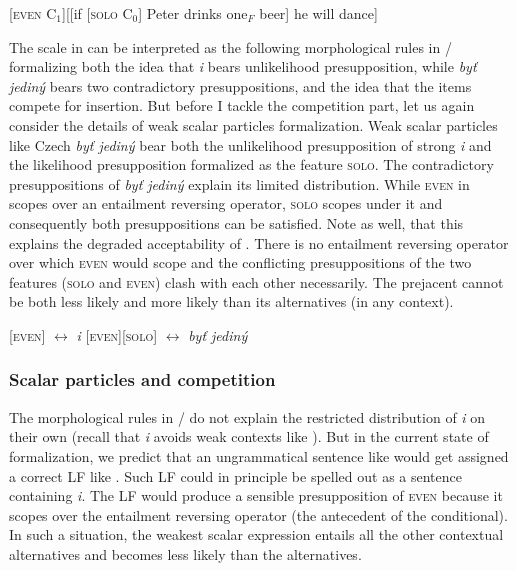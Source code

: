 \documentclass[output=paper,colorlinks,citecolor=brown]{langscibook}
\begin{document}
\ea\label{ex:46}[\textsc{even} C$_1$][[if [\textsc{solo} C$_0$] Peter drinks one$_F$ beer] he will dance]
\z

\noindent The scale in  can be interpreted as the following morphological rules in / formalizing both the idea that \emph{i} bears unlikelihood presupposition, while \emph{byť jediný} bears two contradictory presuppositions, and the idea that the items compete for insertion. But before I tackle the competition part, let us again consider the details of weak scalar particles formalization. Weak scalar particles like Czech \emph{byť jediný} bear both the unlikelihood presupposition of strong \emph{i} and the likelihood presupposition formalized as the feature \textsc{solo}.
The contradictory presuppositions of \emph{byť jediný} explain its limited distribution. While \textsc{even} in  scopes over an entailment reversing operator, \textsc{solo} scopes under it and consequently both presuppositions can be satisfied. Note as well, that this explains the degraded acceptability of . There is no entailment reversing operator over which \textsc{even} would scope and the conflicting presuppositions of the two features (\textsc{solo} and \textsc{even}) clash with each other necessarily. The prejacent cannot be both less likely and more likely than its alternatives (in any context).


\ea\label{ex:47} \ea\label{ex:48-a}[\textsc{even}] $\leftrightarrow$ \textit{i}
\ex\label{ex:48-b} [\textsc{even}][\textsc{solo}] $\leftrightarrow$ \textit{byť jediný}
\z
\z

\z

\subsubsection{Scalar particles and competition}\label{scalar-particles-and-competition}

The morphological rules in / do not explain the restricted distribution of \emph{i} on their own (recall that \emph{i} avoids weak contexts like ). But in the current state of formalization, we predict that an ungrammatical sentence like  would get assigned a correct LF like . Such LF could in principle be spelled out as a sentence containing \emph{i}. The LF  would produce a sensible presupposition of \textsc{even} because it scopes over the entailment reversing operator (the antecedent of the conditional). In such a situation, the weakest scalar expression entails all the other contextual alternatives and becomes less likely than the alternatives.
\end{document}
